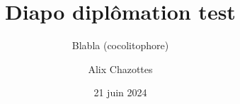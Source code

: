 \documentclass{beamer}
\title[Diapo diplômation test]{Diapo diplômation test}
\subtitle{Blabla (cocolitophore)}
\author{Alix Chazottes}
\institute{CentraleSupélec}
\date{21 juin 2024}
\begin{document}
\begin{frame}
  \titlepage
\end{frame}


\end{document}
